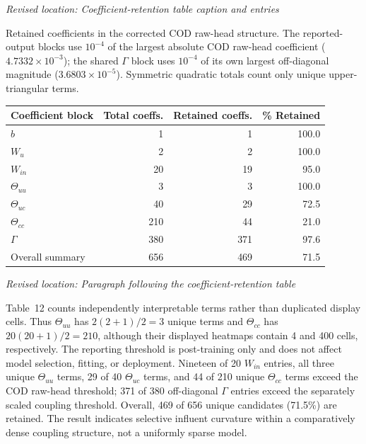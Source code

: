 \documentclass[11pt,a4paper]{article}
\newcommand{\excerptlocation}[1]{\par\noindent\textit{Revised location: #1}\par}
\begin{document}
\excerptlocation{Coefficient-retention table caption and entries}
\begin{revisionexcerpt}
Retained coefficients in the corrected COD raw-head structure. The reported-output blocks use $10^{-4}$ of the largest absolute COD raw-head coefficient ($4.7332\times10^{-3}$); the shared $\Gamma$ block uses $10^{-4}$ of its own largest off-diagonal magnitude ($3.6803\times10^{-5}$). Symmetric quadratic totals count only unique upper-triangular terms.

\begin{center}
\scriptsize
\begin{tabular}{lrrr}
\toprule
Coefficient block & Total coeffs. & Retained coeffs. & \% Retained \\
\midrule
$b$ & 1 & 1 & 100.0 \\
$W_u$ & 2 & 2 & 100.0 \\
$W_{in}$ & 20 & 19 & 95.0 \\
$\Theta_{uu}$ & 3 & 3 & 100.0 \\
$\Theta_{uc}$ & 40 & 29 & 72.5 \\
$\Theta_{cc}$ & 210 & 44 & 21.0 \\
$\Gamma$ & 380 & 371 & 97.6 \\
Overall summary & 656 & 469 & 71.5 \\
\bottomrule
\end{tabular}
\end{center}
\end{revisionexcerpt}

\excerptlocation{Paragraph following the coefficient-retention table}
\begin{revisionexcerpt}
Table~12 counts independently interpretable terms rather than duplicated display cells. Thus $\Theta_{uu}$ has $2(2+1)/2=3$ unique terms and $\Theta_{cc}$ has $20(20+1)/2=210$, although their displayed heatmaps contain 4 and 400 cells, respectively. The reporting threshold is post-training only and does not affect model selection, fitting, or deployment. Nineteen of 20 $W_{in}$ entries, all three unique $\Theta_{uu}$ terms, 29 of 40 $\Theta_{uc}$ terms, and 44 of 210 unique $\Theta_{cc}$ terms exceed the COD raw-head threshold; 371 of 380 off-diagonal $\Gamma$ entries exceed the separately scaled coupling threshold. Overall, 469 of 656 unique candidates (71.5\%) are retained. The result indicates selective influent curvature within a comparatively dense coupling structure, not a uniformly sparse model.
\end{revisionexcerpt}
\end{document}
